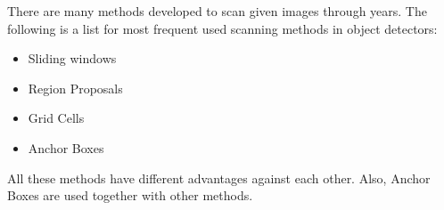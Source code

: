 \documentclass{article}
\begin{document}
\setlength{\parindent}{6ex}

There are many methods developed to scan given images through years.
The following is a list for most frequent used scanning methods in 
object detectors:
\indent

\begin{itemize}
    \item Sliding windows
    \item Region Proposals
    \item Grid Cells
    \item Anchor Boxes
\end{itemize}
\indent

All these methods have different advantages against each other. Also, 
Anchor Boxes are used together with other methods.
\end{document}
